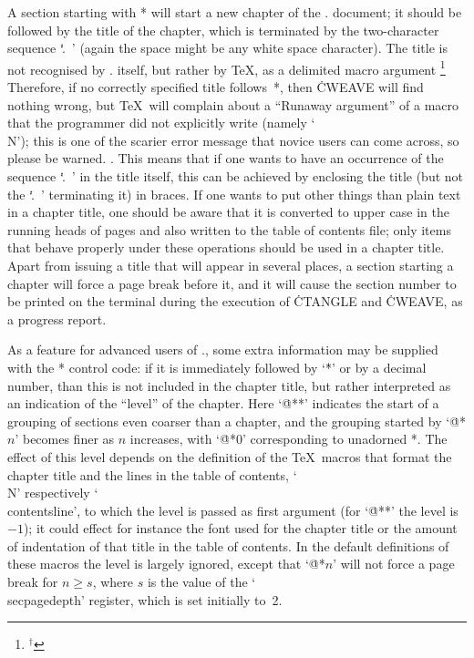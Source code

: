 A section starting with \:* will start a new chapter of the \CWEB.
document; it should be followed by the title of the chapter, which is
terminated by the two-character sequence `\hbox{\.{. }}' (again the space
might be any white space character). The title is not recognised by \CWEB.
itself, but rather by \TeX, as a delimited macro argument
\unskip\footnote{${}^\dagger$}
{Therefore, if no correctly specified title follows~\:*, then
 \.{CWEAVE} will find nothing wrong, but \TeX\ will complain about a
 ``Runaway argument'' of a macro that the programmer did not explicitly
 write (namely `\.{\\N}'); this is one of the scarier error message that
 novice users can come across, so please be warned.
}.
This means that if one wants to have an occurrence of the sequence
`\hbox{\.{. }}' in the title itself, this can be achieved by enclosing the
title (but not the `\hbox{\.{. }}' terminating it) in braces.  If one wants
to put other things than plain text in a chapter title, one should be aware
that it is converted to upper case in the running heads of pages and also
written to the table of contents file; only items that behave properly under
these operations should be used in a chapter title. Apart from issuing a
title that will appear in several places, a section starting a chapter will
force a page break before it, and it will cause the section number to be
printed on the terminal during the execution of \.{CTANGLE} and \.{CWEAVE},
as a progress report.

As a feature for advanced users of \CWEB., some extra information may be
supplied with the \:* control code: if it is immediately followed by `\.*'
or by a decimal number, than this is not included in the chapter title, but
rather interpreted as an indication of the ``level'' of the chapter. Here
`\.{@**}' indicates the start of a grouping of sections even coarser than a
chapter, and the grouping started by `\.{@*$n$}' becomes finer as $n$
increases, with `\.{@*0}' corresponding to unadorned \:*. The effect of this
level depends on the definition of the \TeX\ macros that format the chapter
title and the lines in the table of contents, `\.{\\N}' respectively
`\.{\\contentsline}', to which the level is passed as first argument (for
`\.{@**}' the level is~$-1$); it could effect for instance the font used for
the chapter title or the amount of indentation of that title in the table of
contents. In the default definitions of these macros the level is largely
ignored, except that `\.{@*$n$}' will not force a page break for $n\geq s$,
where $s$ is the value of the `\.{\\secpagedepth}' register, which is set
initially to~2.

